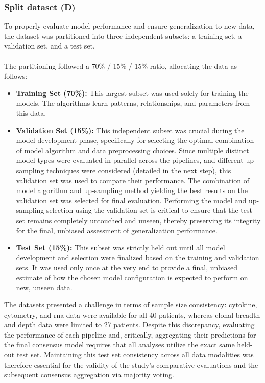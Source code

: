 \documentclass[12pt,a4paper]{report}
\begin{document}
\subsubsection*{Split dataset \hyperref[fig:pipeline-1]{(D)}}
To properly evaluate model performance and ensure generalization to new data, the dataset was partitioned into three independent subsets: a training set, a validation set, and a test set.\\
\\
The partitioning followed a 70\% / 15\% / 15\% ratio, allocating the data as follows:
\begin{itemize}
    \item \textbf{Training Set (70\%):} This largest subset was used solely for training the models. The algorithms learn patterns, relationships, and parameters from this data.
    \item \textbf{Validation Set (15\%):} This independent subset was crucial during the model development phase, specifically for selecting the optimal combination of model algorithm and data preprocessing choices. Since multiple distinct model types were evaluated in parallel across the pipelines, and different up-sampling techniques were considered (detailed in the next step), this validation set was used to compare their performance. The combination of model algorithm and up-sampling method yielding the best results on the validation set was selected for final evaluation. Performing the model and up-sampling selection using the validation set is critical to ensure that the test set remains completely untouched and unseen, thereby preserving its integrity for the final, unbiased assessment of generalization performance.
    \item \textbf{Test Set (15\%):} This subset was strictly held out until all model development and selection were finalized based on the training and validation sets. It was used only once at the very end to provide a final, unbiased estimate of how the chosen model configuration is expected to perform on new, unseen data.
\end{itemize}
\noindent
The datasets presented a challenge in terms of sample size consistency: cytokine, cytometry, and \acrshort{rna} data were available for all 40 patients, whereas clonal breadth and depth data were limited to 27 patients. Despite this discrepancy, evaluating the performance of each pipeline and, critically, aggregating their predictions for the final consensus model requires that all analyses utilize the exact same held-out test set. Maintaining this test set consistency across all data modalities was therefore essential for the validity of the study's comparative evaluations and the subsequent consensus aggregation via majority voting.
\end{document}
